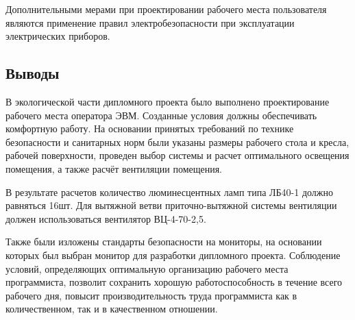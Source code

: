Дополнительными мерами при проектировании рабочего места пользователя являются применение правил электробезопасности при эксплуатации электрических приборов.

\subsection{Выводы}
В экологической части дипломного проекта было выполнено проектирование рабочего места оператора ЭВМ. Созданные условия должны обеспечивать комфортную работу. На основании принятых требований по технике безопасности и санитарных норм были указаны размеры рабочего стола и кресла, рабочей поверхности, проведен выбор системы и расчет оптимального освещения помещения, а также расчёт вентиляции помещения.

В результате расчетов количество люминесцентных ламп типа ЛБ40-1 должно равняться 16шт. Для вытяжной ветви приточно-вытяжной системы вентиляции должен использоваться вентилятор ВЦ-4-70-2,5.

Также были изложены стандарты безопасности на мониторы, на основании которых был выбран монитор для разработки дипломного проекта. Соблюдение условий, определяющих оптимальную организацию рабочего места программиста, позволит сохранить хорошую работоспособность в течение всего рабочего дня, повысит производительность труда программиста как в количественном, так и в качественном отношении.
